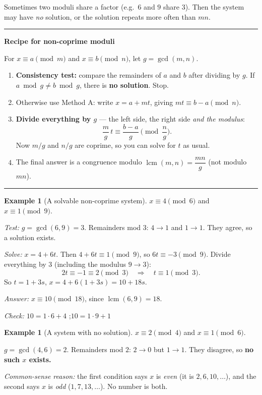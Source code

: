 \documentclass[11pt]{article}
\theoremstyle{definition}
\newtheorem{example}[theorem]{Example}
\theoremstyle{remark}
\newenvironment{recipe}[1]{\par\medskip\noindent\begin{minipage}{\linewidth}\noindent\rule{\linewidth}{0.8pt}\par\smallskip\noindent\textbf{#1}\par\smallskip}{\par\noindent\rule{\linewidth}{0.8pt}\end{minipage}\par\medskip}
\begin{document}
Sometimes two moduli share a factor (e.g.\ $6$ and $9$ share $3$). Then the system may have \emph{no} solution, or the solution repeats more often than $mn$.

\begin{recipe}{Recipe for non-coprime moduli}
For $x\equiv a\pmod m$ and $x\equiv b\pmod n$, let $g=\gcd(m,n)$.
\begin{enumerate}[leftmargin=1.6em,itemsep=2pt]
\item \textbf{Consistency test:} compare the remainders of $a$ and $b$ after dividing by $g$. If $a\bmod g\neq b\bmod g$, there is \textbf{no solution}. Stop.
\item Otherwise use Method A: write $x=a+mt$, giving $mt\equiv b-a\pmod n$.
\item \textbf{Divide everything by $g$} --- the left side, the right side \emph{and the modulus}:
\[ \frac mg\,t\equiv\frac{b-a}{g}\pmod{\frac ng}. \]
Now $m/g$ and $n/g$ are coprime, so you can solve for $t$ as usual.
\item The final answer is a congruence modulo $\operatorname{lcm}(m,n)=\dfrac{mn}{g}$ (not modulo $mn$).
\end{enumerate}
\end{recipe}

\begin{example}[A solvable non-coprime system]\label{ex:qs-nc1}
$x\equiv 4\pmod 6$ and $x\equiv 1\pmod 9$.

\emph{Test:} $g=\gcd(6,9)=3$. Remainders mod $3$: $4\to1$ and $1\to1$. They agree, so a solution exists.

\emph{Solve:} $x=4+6t$. Then $4+6t\equiv1\pmod 9$, so $6t\equiv-3\pmod 9$. Divide everything by $3$ (including the modulus $9\to3$): 
\[
2t\equiv -1\equiv 2\pmod 3\quad\Longrightarrow\quad t\equiv1\pmod 3.
\]
So $t=1+3s$, $x=4+6(1+3s)=10+18s$.

\emph{Answer:} $x\equiv10\pmod{18}$, since $\operatorname{lcm}(6,9)=18$.

\emph{Check:} $10=1\cdot6+4$ \checkmark;\quad $10=1\cdot9+1$ \checkmark
\end{example}

\begin{example}[A system with no solution]\label{ex:qs-nc2}
$x\equiv 2\pmod 4$ and $x\equiv 1\pmod 6$.

$g=\gcd(4,6)=2$. Remainders mod $2$: $2\to0$ but $1\to1$. They disagree, so \textbf{no such $x$ exists.}

\emph{Common-sense reason:} the first condition says $x$ is \emph{even} (it is $2,6,10,\dots$), and the second says $x$ is \emph{odd} ($1,7,13,\dots$). No number is both.
\end{example}
\end{document}
